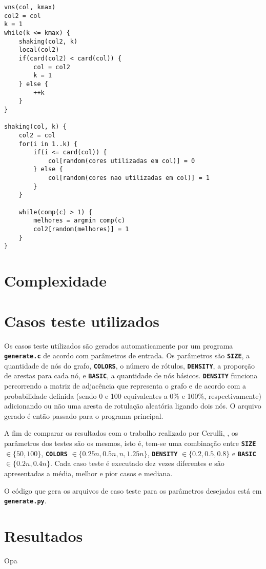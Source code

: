 \documentclass[12pt, a4paper]{article}
\newcommand{\ic}[1]{\textbf{\lstinline{#1}}}
\begin{document}
\begin{lstlisting}[caption=Pseudocódigo para VNS, basicstyle=\ttfamily\scriptsize]
vns(col, kmax)
col2 = col
k = 1
while(k <= kmax) {
    shaking(col2, k)
    local(col2)
    if(card(col2) < card(col)) {
        col = col2
        k = 1
    } else {
        ++k
    }
}

shaking(col, k) {
    col2 = col
    for(i in 1..k) {
        if(i <= card(col)) {
            col[random(cores utilizadas em col)] = 0
        } else {
            col[random(cores nao utilizadas em col)] = 1
        }
    }

    while(comp(c) > 1) {
        melhores = argmin comp(c)
        col2[random(melhores)] = 1
    }
}
\end{lstlisting}


\section{Complexidade}

\section{Casos teste utilizados}
Os casos teste utilizados são gerados automaticamente por um programa
\ic{generate.c} de acordo com parâmetros de entrada. Os parâmetros são
\ic{SIZE}, a quantidade de nós do grafo, \ic{COLORS}, o número de rótulos,
\ic{DENSITY}, a proporção de arestas para cada nó, e \ic{BASIC}, a quantidade
de nós básicos. \ic{DENSITY} funciona percorrendo a matriz de adjacência que
representa o grafo e de acordo com a probabilidade definida (sendo 0 e 100
equivalentes a 0\% e 100\%, respectivamente) adicionando ou não uma aresta de
rotulação aleatória ligando dois nós. O arquivo gerado é então passado para o
programa principal.

A fim de comparar os resultados com o trabalho realizado por Cerulli,
\cite{cerulli}, os parâmetros dos testes são os mesmos, isto é, tem-se uma
combinação entre \ic{SIZE} $ \in \{50, 100\} $, \ic{COLORS} $ \in \{0.25n,
0.5n, n, 1.25n\} $, \ic{DENSITY} $ \in \{0.2, 0.5, 0.8\}$ e \ic{BASIC} $ \in
\{0.2n, 0.4n\} $. Cada caso teste é executado dez vezes diferentes e são
apresentadas a média, melhor e pior casos e mediana.

O código que gera os arquivos de caso teste para os parâmetros desejados está
em \ic{generate.py}.

\section{Resultados}
\begin{table}[h]
\footnotesize

\caption{Opa}
\normalsize
\end{table}
\end{document}
